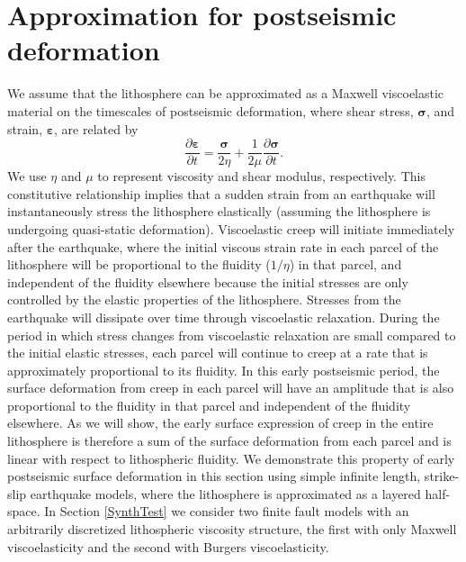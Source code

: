 \section{Approximation for postseismic deformation} 
We assume that the lithosphere can be approximated as a Maxwell
viscoelastic material on the timescales of postseismic deformation,
where shear stress, $\mathbf{\sigma}$, and strain,
$\mathbf{\varepsilon}$, are related by
\begin{equation}
  \frac{\partial\mathbf{\varepsilon}}{\partial t}=\frac{\mathbf{\sigma}}{2\eta} + 
                              \frac{1}{2\mu}\frac{\partial\mathbf{\sigma}}{\partial t}.
\end{equation}
We use $\eta$ and $\mu$ to represent viscosity and shear modulus,
respectively.  This constitutive relationship implies that a sudden
strain from an earthquake will instantaneously stress the lithosphere
elastically (assuming the lithosphere is undergoing quasi-static
deformation).  Viscoelastic creep will initiate immediately after the
earthquake, where the initial viscous strain rate in each parcel of
the lithosphere will be proportional to the fluidity ($1/\eta$) in
that parcel, and independent of the fluidity elsewhere because the
initial stresses are only controlled by the elastic properties of the
lithosphere.  Stresses from the earthquake will dissipate over time
through viscoelastic relaxation.  During the period in which stress
changes from viscoelastic relaxation are small compared to the initial
elastic stresses, each parcel will continue to creep at a rate that is
approximately proportional to its fluidity.  In this early postseismic
period, the surface deformation from creep in each parcel will have an
amplitude that is also proportional to the fluidity in that parcel and
independent of the fluidity elsewhere.  As we will show, the early
surface expression of creep in the entire lithosphere is therefore a
sum of the surface deformation from each parcel and is linear with
respect to lithospheric fluidity.  We demonstrate this property of
early postseismic surface deformation in this section using simple
infinite length, strike-slip earthquake models, where the lithosphere
is approximated as a layered half-space. In Section \ref{SynthTest} we
consider two finite fault models with an arbitrarily discretized
lithospheric viscosity structure, the first with only Maxwell
viscoelasticity and the second with Burgers viscoelasticity.

